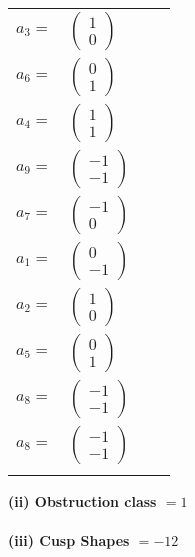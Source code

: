 \documentclass[1p]{elsarticle_modified}
\theoremstyle{definition}
\begin{document}
\begin{tabular}{m{7pt} m{180pt} m{7pt} m{180pt} }
\flushright $a_{3}=$&$\begin{pmatrix}1\\0\end{pmatrix}$ \\
\flushright $a_{6}=$&$\begin{pmatrix}0\\1\end{pmatrix}$ \\
\flushright $a_{4}=$&$\begin{pmatrix}1\\1\end{pmatrix}$ \\
\flushright $a_{9}=$&$\begin{pmatrix}-1\\-1\end{pmatrix}$ \\
\flushright $a_{7}=$&$\begin{pmatrix}-1\\0\end{pmatrix}$ \\
\flushright $a_{1}=$&$\begin{pmatrix}0\\-1\end{pmatrix}$ \\
\flushright $a_{2}=$&$\begin{pmatrix}1\\0\end{pmatrix}$ \\
\flushright $a_{5}=$&$\begin{pmatrix}0\\1\end{pmatrix}$ \\
\flushright $a_{8}=$&$\begin{pmatrix}-1\\-1\end{pmatrix}$\\ \flushright $a_{8}=$&$\begin{pmatrix}-1\\-1\end{pmatrix}$\\&\end{tabular}
\flushleft \textbf{(ii) Obstruction class $= 1$}\\~\\
\flushleft \textbf{(iii) Cusp Shapes $= -12$}\\~\\
\end{document}
